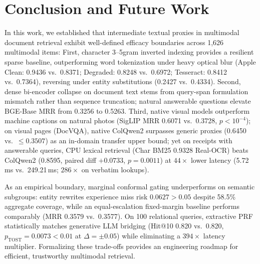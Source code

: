 \vspace{3.5mm}
\section{Conclusion and Future Work}
\label{sec:conclusion}

In this work, we established that intermediate textual proxies in multimodal document retrieval exhibit well-defined efficacy boundaries across 1,626 multimodal items: First, character 3--5gram inverted indexing provides a resilient sparse baseline, outperforming word tokenization under heavy optical blur (Apple Clean: 0.9436 vs.\ 0.8371; Degraded: 0.8248 vs.\ 0.6972; Tesseract: 0.8412 vs.\ 0.7364), reversing under entity substitutions (0.2427 vs.\ 0.4334). Second, dense bi-encoder collapse on document text stems from query-span formulation mismatch rather than sequence truncation; natural answerable questions elevate BGE-Base MRR from 0.3256 to 0.5263. Third, native visual models outperform machine captions on natural photos (SigLIP MRR 0.6071 vs.\ 0.3728, $p < 10^{-4}$); on visual pages (DocVQA), native ColQwen2 surpasses generic proxies (0.6450 vs.\ $\le 0.3507$) as an in-domain transfer upper bound; yet on receipts with answerable queries, CPU lexical retrieval (Char BM25 0.9328 Real-OCR) beats ColQwen2 (0.8595, paired diff $+0.0733$, $p=0.0011$) at $44\times$ lower latency (5.72\,ms vs.\ 249.21\,ms; $286\times$ on verbatim lookups).

As an empirical boundary, marginal conformal gating underperforms on semantic subgroups: entity rewrites experience miss risk $0.0627 > 0.05$ despite 58.5\% aggregate coverage, while an equal-escalation fixed-margin baseline performs comparably (MRR 0.3579 vs.\ 0.3577). On 100 relational queries, extractive PRF statistically matches generative LLM bridging (Hit@10 0.820 vs.\ 0.820, $p_{\text{TOST}}=0.0073 < 0.01$ at $\Delta=\pm 0.05$) while eliminating a $394\times$ latency multiplier. Formalizing these trade-offs provides an engineering roadmap for efficient, trustworthy multimodal retrieval.

\vspace{4.0mm}
\appendices

